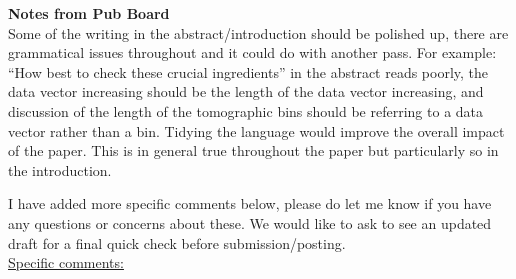 \documentclass{article}
\begin{document}
	
	{\Large\textbf{Notes from Pub Board}}\\
	
	Some of the writing in the abstract/introduction should be polished up, there are grammatical issues throughout and it could do with another pass. For example: “How best to check these crucial ingredients” in the abstract reads poorly, the data vector increasing should be the length of the data vector increasing, and discussion of the length of the tomographic bins should be referring to a data vector rather than a bin. Tidying the language would improve the overall impact of the paper. This is in general true throughout the paper but particularly so in the introduction.
	
	I have added more specific comments below, please do let me know if you have any questions or concerns about these. We would like to ask to see an updated draft for a final quick check before submission/posting.\\
	
	\underline{Specific comments:}
	
\end{document}

